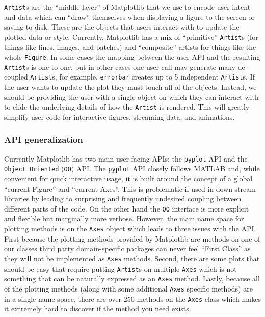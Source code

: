 \documentclass[11pt]{article}  %
\begin{document}
\texttt{Artist}s are the ``middle layer'' of Matplotlib that we use to
encode user-intent and data which can ``draw'' themselves when
displaying a figure to the screen or saving to disk.  These are the
objects that users interact with to update the plotted data or style.
Currently, Matplotlib has a mix of ``primitive'' \texttt{Artist}s (for
things like lines, images, and patches) and ``composite'' artists for
things like the whole \texttt{Figure}.  In some cases the mapping
between the user API and the resulting \texttt{Artist}s is one-to-one,
but in other cases one user call may generate many de-coupled
\texttt{Artist}s, for example, \texttt{errorbar} creates up to 5
independent \texttt{Artist}s.  If the user wants to update the plot
they must touch all of the objects.  Instead, we should be providing
the user with a single object on which they can interact with to elide
the underlying details of how the \texttt{Artist} is rendered.  This
will greatly simplify user code for interactive figures, streaming
data, and animations.


\subsubsection{API generalization}

Currently Matplotlib has two main user-facing APIs: the
\texttt{pyplot} API and the \texttt{Object Oriented} (\texttt{OO})
API.  The \texttt{pyplot} API closely follows MATLAB and, while
convenient for quick interactive usage, it is built around the concept
of a global ``current Figure'' and ``current Axes''.  This is
problematic if used in down stream libraries by leading to surprising
and frequently undesired coupling between different parts of the code.
On the other hand the \texttt{OO} interface is more explicit and
flexible but marginally more verbose.  However, the main name space
for plotting methods is on the \texttt{Axes} object which leads to
three issues with the API.  First because the plotting methods
provided by Matplotlib are methods on one of our classes third party
domain-specific packages can never feel ``First Class'' as they will
not be implemented as \texttt{Axes} methods.  Second, there are some
plots that should be easy that require putting \texttt{Artist}s on
multiple \texttt{Axes} which is not something that can be naturally
expressed as an \texttt{Axes} method.  Lastly, because all of the
plotting methods (along with some additional \texttt{Axes} specific
methods) are in a single name space, there are over 250 methods on the
\texttt{Axes} class which makes it extremely hard to discover if the
method you need exists.
\end{document}
